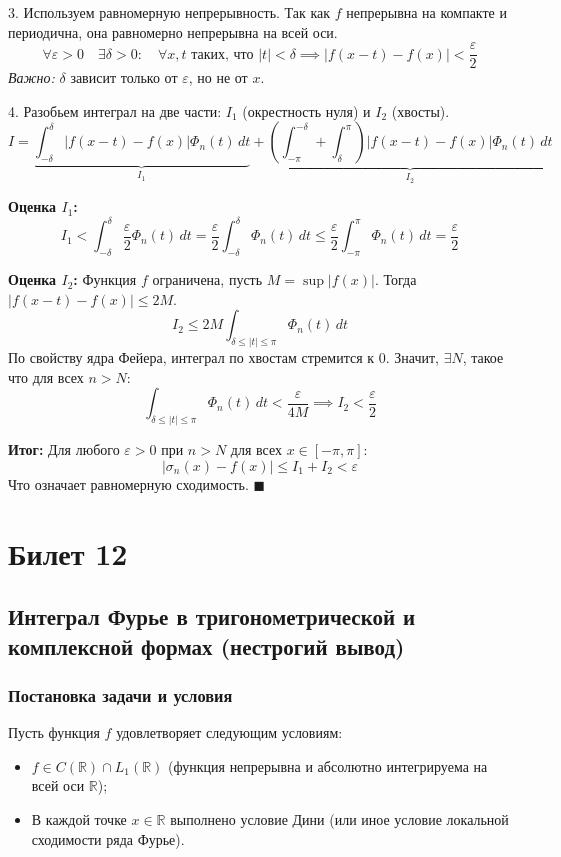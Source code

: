 \documentclass[12pt,a4paper,openany]{book}
\begin{document}
3. Используем равномерную непрерывность.
Так как $f$ непрерывна на компакте и периодична, она равномерно непрерывна на всей оси.
$$ \forall \varepsilon > 0 \quad \exists \delta > 0: \quad \forall x, t \text{ таких, что } |t| < \delta \implies |f(x-t) - f(x)| < \frac{\varepsilon}{2} $$
\textit{Важно:} $\delta$ зависит только от $\varepsilon$, но не от $x$.

4. Разобьем интеграл на две части: $I_1$ (окрестность нуля) и $I_2$ (хвосты).
$$ I = \underbrace{\int_{-\delta}^{\delta} |f(x-t) - f(x)| \Phi_n(t)\,dt}_{I_1} + \underbrace{\left( \int_{-\pi}^{-\delta} + \int_{\delta}^{\pi} \right) |f(x-t) - f(x)| \Phi_n(t)\,dt}_{I_2} $$

\textbf{Оценка $I_1$:}
$$ I_1 < \int_{-\delta}^{\delta} \frac{\varepsilon}{2} \Phi_n(t)\,dt = \frac{\varepsilon}{2} \int_{-\delta}^{\delta} \Phi_n(t)\,dt \le \frac{\varepsilon}{2} \int_{-\pi}^{\pi} \Phi_n(t)\,dt = \frac{\varepsilon}{2} $$

\textbf{Оценка $I_2$:}
Функция $f$ ограничена, пусть $M = \sup |f(x)|$. Тогда $|f(x-t) - f(x)| \le 2M$.
$$ I_2 \le 2M \int_{\delta \le |t| \le \pi} \Phi_n(t)\,dt $$
По свойству ядра Фейера, интеграл по хвостам стремится к 0. Значит, $\exists N$, такое что для всех $n > N$:
$$ \int_{\delta \le |t| \le \pi} \Phi_n(t)\,dt < \frac{\varepsilon}{4M} \implies I_2 < \frac{\varepsilon}{2} $$

\textbf{Итог:}
Для любого $\varepsilon > 0$ при $n > N$ для всех $x \in [-\pi, \pi]$:
$$ |\sigma_n(x) - f(x)| \le I_1 + I_2 < \varepsilon $$
Что означает равномерную сходимость. $\blacksquare$
\chapter{Билет 12}
\section{ Интеграл Фурье в тригонометрической и комплексной формах (нестрогий вывод)}

\subsection{ Постановка задачи и условия}
Пусть функция $f$ удовлетворяет следующим условиям:
\begin{itemize}
    \item $f \in C(\mathbb{R}) \cap L_1(\mathbb{R})$ (функция непрерывна и абсолютно интегрируема на всей оси $\mathbb{R}$);
    \item В каждой точке $x \in \mathbb{R}$ выполнено условие Дини (или иное условие локальной сходимости ряда Фурье).
\end{itemize}
\end{document}
